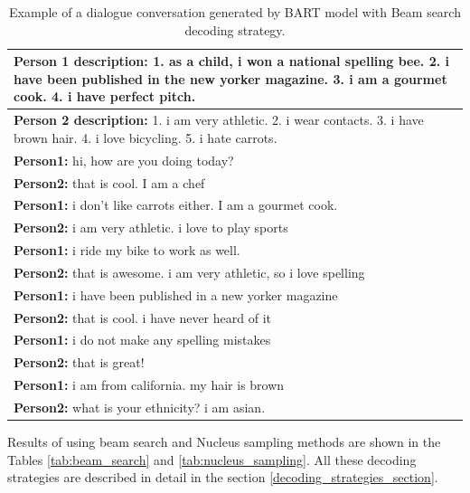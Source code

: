 \begin{table}
\centering
 \begin{tabular}{|p{14cm}|}
 \hline
 \textbf{Person 1 description:} 1. as a child, i won a national spelling bee. 2. i have been published in the new yorker magazine. 3. i am a gourmet cook. 4. i have perfect pitch. \\
 \hline
 \textbf{Person 2 description:} 1. i am very athletic. 2. i wear contacts. 3. i have brown hair. 4. i love bicycling. 5. i hate carrots. \\
 \hline
 \textbf{Person1:} hi, how are you doing today?  \\
 \textbf{Person2:} that is cool. I am a chef  \\ 
 \textbf{Person1:} i don't like carrots either. I am a gourmet cook. \\
 \textbf{Person2:} i am very athletic. i love to play sports \\
 \textbf{Person1:} i ride my bike to work as well. \\
 \textbf{Person2:} that is awesome. i am very athletic, so i love spelling \\
 \textbf{Person1:} i have been published in a new yorker magazine \\
 \textbf{Person2:} that is cool. i have never heard of it \\
 \textbf{Person1:} i do not make any spelling mistakes\\
 \textbf{Person2:} that is great! \\
 \textbf{Person1:} i am from california. my hair is brown \\
 \textbf{Person2:} what is your ethnicity? i am asian. \\
 \hline
 \end{tabular}
 \caption{Example of a dialogue conversation generated by BART model with Beam search decoding strategy.}
\label{tab:bart_experiment}
\end{table}

Results of using beam search and Nucleus sampling methods are shown in the Tables \ref{tab:beam_search} and \ref{tab:nucleus_sampling}. All these decoding strategies are described in detail in the section \ref{decoding_strategies_section}.

